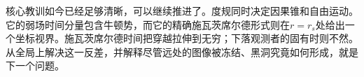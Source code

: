 \begin{classroomqa}
\end{classroomqa}

核心教训如今已经足够清晰，可以继续推进了。度规同时决定因果锥和自由运动。它的弱场时间分量包含牛顿势，而它的精确施瓦茨席尔德形式则在\(r=r_s\)处给出一个坐标视界。施瓦茨席尔德时间把穿越拉伸到无穷；下落观测者的固有时则不然。从全局上解决这一反差，并解释尽管远处的图像被冻结、黑洞究竟如何形成，就是下一个问题。
